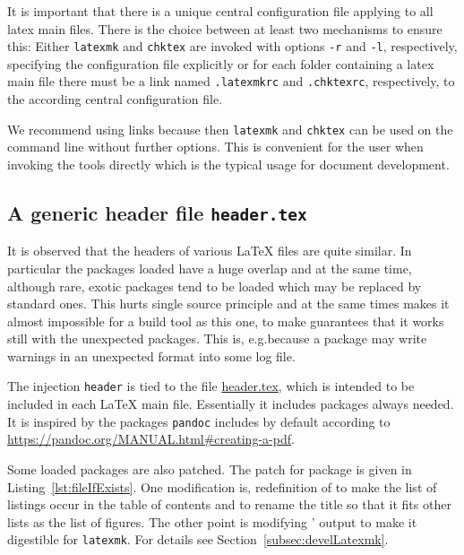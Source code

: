 It is important that there is a unique central configuration file 
applying to all latex main files. 
There is the choice between at least two mechanisms to ensure this: 
Either \texttt{latexmk} and \texttt{chktex} 
are invoked with options \texttt{-r} and \texttt{-l}, respectively, 
specifying the configuration file explicitly 
or for each folder containing a latex main file 
there must be a link named \texttt{.latexmkrc} and \texttt{.chktexrc}, respectively, 
to the according central configuration file. 

We recommend using links because then \texttt{latexmk} and \texttt{chktex} 
can be used on the command line without further options. 
This is convenient for the user when invoking the tools directly 
which is the typical usage for document development. 


\subsection{A generic header file \texttt{header.tex}}\label{subsec:header}

It is observed that the headers of various \LaTeX{} files are quite similar. 
In particular the packages loaded 
have a huge overlap and at the same time, although rare, 
exotic packages tend to be loaded which may be replaced by standard ones. 
This hurts single source principle 
and at the same times makes it almost impossible 
for a build tool as this one, 
to make guarantees that it works still with the unexpected packages. 
This is, e.g.\@ because a package may write warnings 
in an unexpected format into some log file. 

The injection \texttt{header} 
is tied to the file \href{\urlSite fromTex/header.tex}{header.tex}, 
which is intended to be included in each \LaTeX{} main file. 
Essentially it includes packages always needed. 
It is inspired by the packages \texttt{pandoc} includes by default 
according to \url{https://pandoc.org/MANUAL.html#creating-a-pdf}. 

Some loaded packages are also patched. 
The patch for package  is given in Listing~\ref{lst:fileIfExists}. 
One modification is, redefinition of  
to make the list of listings occur in the table of contents 
and to rename the title so that it fits other lists as the list of figures.  
The other point is modifying ' output to make it digestible for \texttt{latexmk}. 
For details see Section~\ref{subsec:develLatexmk}. 

